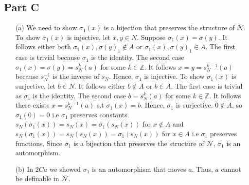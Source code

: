 \documentclass[10pt]{article}
\begin{document}
\subsection*{Part C}
    \begin{itemize}
        \item [(a)] We need to show $\sigma_1(x)$ is a bijection that preserves the structure of $\mathcal{N}$. 
        To show $\sigma_1(x)$ is injective, let $x,y\in N$. 
        Suppose $\sigma_1(x)=\sigma(y)$. 
        It follows either both $\sigma_1(x),\sigma(y)_1\not\in A$ or $\sigma_1(x),\sigma(y)_1\in A$. 
        The first case is trivial because $\sigma_1$ is the identity. 
        The second case $\sigma_1(x)=\sigma(y)=s_N^k(a)$ for some $k\in\mathbb{Z}$. 
        It follows $x=y=s_N^{k-1}(a)$ because $s_N^{-1}$ is the inverse of $s_N$.
        Hence, $\sigma_1$ is injective.
        To show $\sigma_1(x)$ is surjective, let $b\in N$.
        It follows either $b\not\in A$ or $b\in A$. 
        The first case is trivial as $\sigma_1$ is the identity.
        The second case $b=s_N^k(a)$ for some $k\in\mathbb{Z}$.
        It follows there exists $x=s_N^{k-1}(a)$ s.t $\sigma_1(x)=b$.
        Hence, $\sigma_1$ is surjective.
        $0\not\in A$, so $\sigma_1(0)=0$ i.e $\sigma_1$ preserves constants.
        $s_N(\sigma_1(x))=s_N(x)=\sigma_1(s_N(x))$ for $x\not\in A$ and $s_N(\sigma_1(x))=s_N(s_N(x))=\sigma_1(s_N(x))$ for $x\in A$ i.e $\sigma_1$ preserves functions.
        Since $\sigma_1$ is a bijection that preserves the structure of $\mathcal{N}$, $\sigma_1$ is an automorphism.
        \item [(b)] In $2Ca$ we showed $\sigma_1$ is an automorphism that moves $a$. Thus, $a$ cannot be definable in $\mathcal{N}$.
    \end{itemize}
\end{document}
